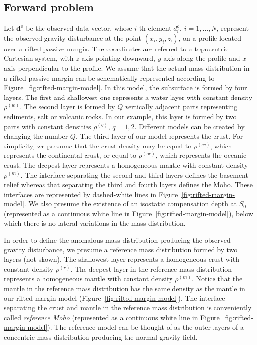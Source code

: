 \documentclass[manuscript]{geophysics}
\begin{document}
\subsection{Forward problem}


Let $\mathbf{d}^{o}$ be the observed data vector, whose $i$-th element $d^{o}_{i}$, 
$i = 1, \dots, N$, represent the observed gravity disturbance at the point 
$(x_{i}, y_{i}, z_{i})$, on a profile located over a rifted passive margin. The
coordinates are referred to a topocentric Cartesian system, with $z$ axis pointing
downward, $y$-axis along the profile and $x$-axis perpendicular to the profile. 
We assume that the actual mass distribution in a rifted passive margin can be 
schematically represented according to Figure~\ref{fig:rifted-margin-model}. 
In this model, the subsurface is formed by four layers. 
The first and shallowest one represents a water layer with constant density
$\rho^{(w)}$. 
The second layer is formed by $Q$ vertically adjacent parts representing sediments,
salt or volcanic rocks.
In our example, this layer is formed by two parts with constant densities
$\rho^{(q)}$, $q = 1, 2$. Different models can be created by changing the number $Q$.
The third layer of our model represents the crust. For simplicity, we presume that the
crust density may be equal to $\rho^{(cc)}$, which
represents the continental crust, or equal to $\rho^{(oc)}$, which represents the
oceanic crust.
The deepest layer represents a homogeneous mantle with constant density $\rho^{(m)}$. 
The interface separating the second and third layers defines the basement relief whereas
that separating the third and fourth layers defines the Moho. These interfaces are
represented by dashed-white lines in Figure~\ref{fig:rifted-margin-model}.
We also presume the existence of an isostatic compensation depth at $S_{0}$ 
(represented as a continuous white line in Figure~\ref{fig:rifted-margin-model}),
below which there is no lateral variations in the mass distribution.

In order to define the anomalous mass distribution producing the observed gravity
disturbance, we presume a reference mass distribution formed by two 
layers (not shown). The shallowest layer represents a homogeneous crust with constant
density $\rho^{(r)}$.
The deepest layer in the reference mass distribution represents a homogeneous mantle
with constant density $\rho^{(m)}$. Notice that the mantle in the reference mass 
distribution has the same density as the mantle in our rifted margin model
(Figure~\ref{fig:rifted-margin-model}).
The interface separating the crust and mantle in the reference mass distribution 
is conveniently called \textit{reference Moho} (represented as a continuous white line
in Figure~\ref{fig:rifted-margin-model}).
The reference model can be thought of as the outer layers of a concentric
mass distribution producing the normal gravity field.
\end{document}
